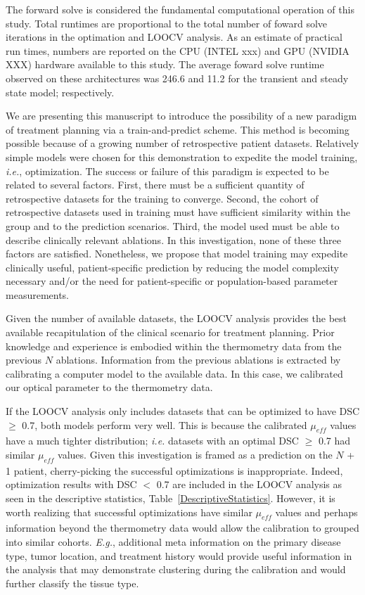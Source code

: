 \documentclass[12pt]{article}
\begin{document}
{The forward solve is considered the fundamental computational
operation of this study.
Total runtimes are  proportional to the total number of foward solve
iterations in the optimation and LOOCV analysis. 
As an estimate of practical run times,
numbers are reported on the CPU (INTEL xxx)  and GPU (NVIDIA XXX) 
hardware available to this study.
The average foward solve runtime observed on these architectures
was 246.6 and 11.2 for the transient and steady state model; respectively. 

We are presenting this manuscript to introduce the possibility
of a new paradigm of treatment planning via a train-and-predict scheme.
This method is becoming possible because of a growing number of retrospective patient
datasets. Relatively simple models were chosen for this demonstration
to expedite the model training, \textit{i.e.}, optimization. The success
or failure of this paradigm is expected to be related to several factors.
First, there must be a sufficient quantity of retrospective datasets
for the training to converge. Second, the cohort of retrospective
datasets used in training must have sufficient similarity within the group
and to the prediction scenarios. Third, the model used must be able 
to describe clinically relevant ablations. In this investigation,
none of these three factors are satisfied. Nonetheless,
we propose that model training may expedite clinically useful,
patient-specific prediction by reducing the model complexity necessary
and/or the need for patient-specific or population-based parameter
measurements. }


{\color{red}Given the number of available datasets, the LOOCV analysis
provides the best available recapitulation of the clinical scenario}
for treatment planning. Prior knowledge and experience is embodied
within the thermometry data from the previous $N$ ablations.
Information from the previous ablations is extracted by calibrating
a computer model to the available data. 
In this case, we calibrated our optical parameter to the thermometry data.



If the LOOCV analysis only includes datasets that can be optimized to
have DSC $\geq$ 0.7, both models perform very well. This is because
the calibrated $\mu_\textit{eff}$ values have a much tighter distribution;
\textit{i.e.} datasets with an optimal DSC $\geq$ 0.7 had similar $\mu_\textit{eff}$ values.
Given this investigation is framed as a prediction on the $N$ + 1 patient,
cherry-picking the successful optimizations is inappropriate. Indeed, optimization results
with DSC $<$ 0.7 are included in the LOOCV analysis as seen in the descriptive statistics,
Table~\ref{DescriptiveStatistics}. However,
it is worth realizing that successful optimizations have similar
$\mu_\textit{eff}$ values and perhaps information beyond the
thermometry data would allow the calibration to grouped into similar cohorts.
\textit{E.g.}, additional meta information on the primary disease type, tumor location, and treatment history
would provide
useful information in the analysis that may demonstrate clustering during the calibration
and would further classify the tissue type.
\end{document}
